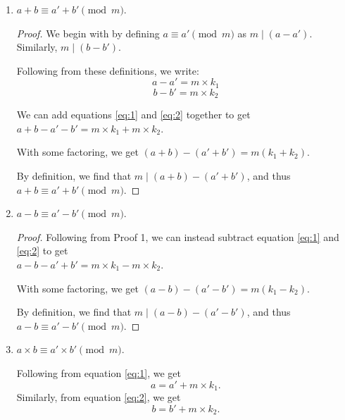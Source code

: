 \documentclass{article}
\begin{document}
\begin{enumerate}
    \item {
        \(a + b \equiv a' + b' \pmod{m}\).

        \begin{proof}
            We begin with by defining \(a \equiv a' \pmod{m}\) as \(m \mid (a - a')\).
            Similarly, \(m \mid (b - b')\).

            Following from these definitions, we write:
            \begin{equation} \label{eq:1}
                a - a' = m \times k_1
            \end{equation}
            \begin{equation} \label{eq:2}
                b - b' = m \times k_2
            \end{equation}

            We can add equations \ref{eq:1} and \ref{eq:2} together to get 
            \(a + b - a' - b' = m \times k_1 + m \times k_2\).

            With some factoring, we get \((a + b) - (a' + b') = m (k_1 + k_2)\).

            By definition, we find that \(m \mid (a + b) - (a' + b')\), and thus
            \(a + b \equiv a' + b' \pmod{m}\).
        \end{proof}
    }

    \item {
        \(a - b \equiv a' - b' \pmod{m}\).

        \begin{proof}
            Following from Proof 1, we can instead subtract equation \ref{eq:1}
            and \ref{eq:2} to get 
            \\ \(a - b - a' + b' = m \times k_1 - m \times k_2\).

            With some factoring, we get \((a-b) - (a'-b') = m(k_1 - k_2)\).

            By definition, we find that \(m \mid (a - b) - (a' - b')\), and thus
            \(a - b \equiv a' - b' \pmod{m}\).
        \end{proof}
    }

    \item {
        \(a \times b \equiv a' \times b' \pmod{m}\).

        Following from equation \ref{eq:1}, we get 
        \begin{equation} \label{eq:3}
            a = a' + m \times k_1.
        \end{equation}
        Similarly, from equation \ref{eq:2}, we  get 
        \begin{equation} \label{eq:4}
            b = b' + m \times k_2.
        \end{equation}

}
\end{enumerate}
\end{document}
